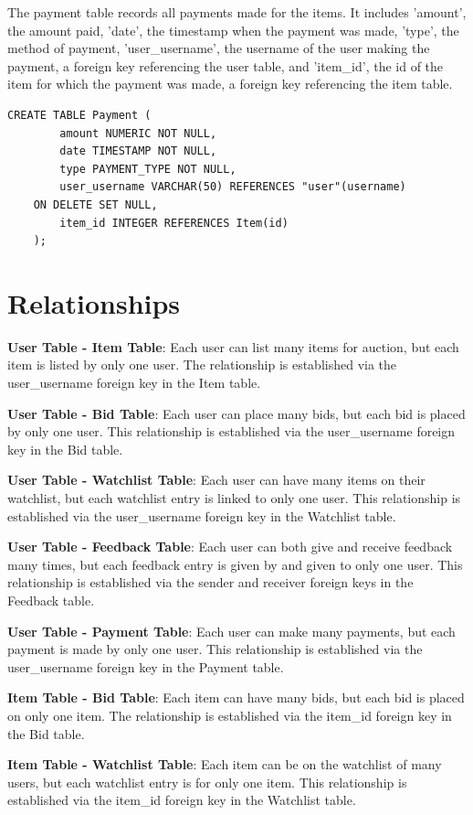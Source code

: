 The payment table records all payments made for the items. It includes 'amount', the amount paid, 'date', the timestamp when the payment was made, 'type', the method of payment, 'user\_username', the username of the user making the payment, a foreign key referencing the user table, and 'item\_id', the id of the item for which the payment was made, a foreign key referencing the item table.

\begin{lstlisting}[style=sqlStyle]
	CREATE TABLE Payment (
		amount NUMERIC NOT NULL,
		date TIMESTAMP NOT NULL,
		type PAYMENT_TYPE NOT NULL,
		user_username VARCHAR(50) REFERENCES "user"(username)
	ON DELETE SET NULL,
		item_id INTEGER REFERENCES Item(id)
	);
\end{lstlisting}


\section{Relationships}
\textbf{User Table - Item Table}: Each user can list many items for auction, but each item is listed by only one user. The relationship is established via the user\_username foreign key in the Item table.

\textbf{User Table - Bid Table}: Each user can place many bids, but each bid is placed by only one user. This relationship is established via the user\_username foreign key in the Bid table.

\textbf{User Table - Watchlist Table}: Each user can have many items on their watchlist, but each watchlist entry is linked to only one user. This relationship is established via the user\_username foreign key in the Watchlist table.

\textbf{User Table - Feedback Table}: Each user can both give and receive feedback many times, but each feedback entry is given by and given to only one user. This relationship is established via the sender and receiver foreign keys in the Feedback table.

\textbf{User Table - Payment Table}: Each user can make many payments, but each payment is made by only one user. This relationship is established via the user\_username foreign key in the Payment table.

\textbf{Item Table - Bid Table}: Each item can have many bids, but each bid is placed on only one item. The relationship is established via the item\_id foreign key in the Bid table.

\textbf{Item Table - Watchlist Table}: Each item can be on the watchlist of many users, but each watchlist entry is for only one item. This relationship is established via the item\_id foreign key in the Watchlist table.

